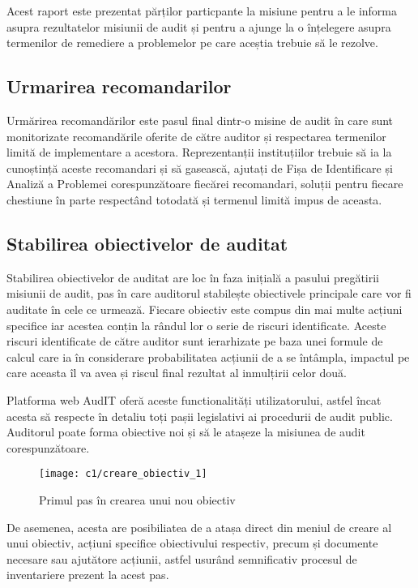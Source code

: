 Acest raport este prezentat părților particpante la misiune pentru a le informa asupra rezultatelor misiunii de audit și pentru a ajunge la o înțelegere asupra termenilor de remediere a problemelor pe care aceștia trebuie să le rezolve.

\subsection*{Urmarirea recomandarilor}

Urmărirea recomandărilor este pasul final dintr-o misine de audit în care sunt monitorizate recomandările oferite de către auditor și respectarea termenilor limită de implementare a acestora. Reprezentanții instituțiilor trebuie să ia la cunoștință aceste recomandari și să gasească, ajutați de Fișa de Identificare și Analiză a Problemei corespunzătoare fiecărei recomandari, soluții pentru fiecare chestiune în parte respectând totodată și termenul limită impus de aceasta.


\subsection{Stabilirea obiectivelor de auditat}

Stabilirea obiectivelor de auditat are loc în faza inițială a pasului pregătirii misiunii de audit, pas în care auditorul stabilește obiectivele principale care vor fi auditate în cele ce urmează. Fiecare obiectiv este compus din mai multe acțiuni specifice iar acestea conțin la rândul lor o serie de riscuri identificate. Aceste riscuri identificate de către auditor sunt ierarhizate pe baza unei formule de calcul care ia în considerare probabilitatea acțiunii de a se întâmpla, impactul pe care aceasta îl va avea și riscul final rezultat al inmulțirii celor două.

Platforma web AudIT oferă aceste functionalități utilizatorului, astfel încat acesta să respecte în detaliu toți pașii legislativi ai procedurii de audit public. Auditorul poate forma obiective noi și să le atașeze la misiunea de audit corespunzătoare.\\

\begin{figure}[h]
	\centering
	
	\texttt{[image: c1/creare\_obiectiv\_1]}
	\caption{Primul pas în crearea unui nou obiectiv	}
\end{figure}

De asemenea, acesta are posibiliatea de a atașa direct din meniul de creare al unui obiectiv, acțiuni specifice obiectivului respectiv, precum și documente necesare sau ajutătore acțiunii, astfel usurând semnificativ procesul de inventariere prezent la acest pas.

